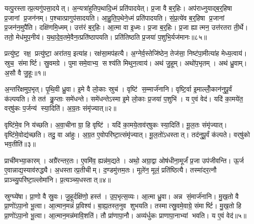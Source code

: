यत्पु॒रस्तात्प्र॒त्यगु॑पसा॒दयेत्। अ॒न्यत्रा॑हुतिप॒थादि॒ध्मं प्रति॑पादयेत्। प्र॒जा वै ब॒र्॒हिः। अप॑राध्नुयाद्ब॒र्॒हिषा प्र॒जानां प्र॒जन॑नम्। प॒श्चात्प्रागुप॑सादयति। आ॒हु॒ति॒प॒थेने॒ध्मं प्रति॑पादयति। सं॒प्र॒त्ये॑व ब॒र्॒हिषा प्र॒जानां प्र॒जन॑न॒मुपै॑ति। दक्षि॑णमि॒ध्मम्। उत्त॑रं ब॒र्॒हिः। आ॒त्मा वा इ॒ध्मः। प्र॒जा ब॒र्॒हिः। प्र॒जा ह्यात्मन॒ उत्त॑रतरा ती॒र्थे। ततो॒ मेध॑मुप॒नीय॑। य॒था॒दे॒व॒तमे॒वैन॒त्प्रति॑ष्ठापयति। प्रति॑तिष्ठति प्र॒जया॑ प॒शुभि॒र्यज॑मानः॥८५॥



\clearpage
{}
\setcounter{anuvakam}{0}
प्रत्यु॑ष्ट॒ रक्ष॒ प्रत्यु॑ष्टा॒ अरा॑तय॒ इत्या॑ह। रक्ष॑सा॒मप॑हत्यै। अ॒ग्नेर्व॒स्तेजि॑ष्ठेन॒ तेज॑सा॒ निष्ट॑पा॒मीत्या॑ह मेध्य॒त्वाय॑। स्रुच॒ संमार्ष्टि। स्रु॒वमग्रे। पुमासमे॒वाभ्य॒ सश्य॑ति मिथुन॒त्वाय॑। अथ॑ जु॒हूम्। अथो॑प॒भृतम्। अथ॑ ध्रु॒वाम्। अ॒सौ वै जु॒हूः॥१॥

अ॒न्तरि॑क्षमुप॒भृत्। पृ॒थि॒वी ध्रु॒वा। इ॒मे वै लो॒काः स्रुच॑। वृष्टि॑ स॒म्मार्ज॑नानि। वृष्टि॒र्वा इ॒माल्लोँ॒कान॑नुपू॒र्वं क॑ल्पयति। ते तत॑ कॢ॒प्ताः समे॑धन्ते। समे॑धन्तेऽस्मा इ॒मे लो॒काः प्र॒जया॑ प॒शुभि॑। य ए॒वं वेद॑। यदि॑ का॒मये॑त॒ वर्‌षु॑कः प॒र्जन्य॑ स्या॒दिति॑। अ॒ग्र॒तः संमृ॑ज्यात्॥२॥

वृष्टि॑मे॒व नि य॑च्छति। अ॒वा॒चीनाग्रा॒ हि वृष्टि॑। यदि॑ का॒मये॒ताव॑र्‌षुकः स्या॒दिति॑। मू॒ल॒तः संमृ॑ज्यात्। वृष्टि॑मे॒वोद्य॑च्छति। तदु॒ वा आ॑हुः। अ॒ग्र॒त ए॒वोपरि॑ष्टा॒त्संमृ॑ज्यात्। मू॒ल॒तो॑ऽधस्तात्। तद॑नुपू॒र्वं क॑ल्पते। वर्‌षु॑को भव॒तीति॑॥३॥

प्राची॑मभ्या॒कारम्। अग्रै॑रन्तर॒तः। ए॒वमि॑व॒ ह्यन्न॑म॒द्यते। अथो॒ अग्रा॒द्वा ओष॑धीना॒मूर्जं॑ प्र॒जा उप॑जीवन्ति। ऊ॒र्ज ए॒वान्नाद्य॒स्याव॑रुद्ध्यै। अ॒धस्तात्प्र॒तीचीम्। द॒ण्डमु॑त्तम॒तः। मूले॑न॒ मूलं॒ प्रति॑ष्ठित्यै। तस्मा॑दर॒त्नौ प्राञ्च्यु॒परि॑ष्टा॒ल्लोमा॑नि। प्र॒त्यञ्च्य॒धस्तात्॥४॥

स्रुग्घ्ये॑षा। प्रा॒णो वै स्रु॒वः। जु॒हूर्दक्षि॑णो॒ हस्त॑। उ॒प॒भृत्स॒व्यः। आ॒त्मा ध्रु॒वा। अन्न सं॒मार्ज॑नानि। मु॒ख॒तो वै प्रा॒णो॑ऽपा॒नो भू॒त्वा। आ॒त्मान॒मन्नं॑ प्र॒विश्य॑। बा॒ह्य॒तस्त॒नुव शुभयति। तस्मात्स्रु॒वमे॒वाग्रे॒ संमार्ष्टि। मु॒ख॒तो हि प्रा॒णो॑ऽपा॒नो भू॒त्वा। आ॒त्मान॒मन्न॑मावि॒शति॑। तौ प्रा॑णापा॒नौ। अव्य॑र्धुकः प्राणापा॒नाभ्यां भवति। य ए॒वं वेद॑॥५॥\anuvakamend[जु॒हूर्मृ॑ज्याद्भव॒तीति॑ प्र॒त्यञ्च्य॒धस्तान्मार्ष्टि॒ पञ्च॑ च]

